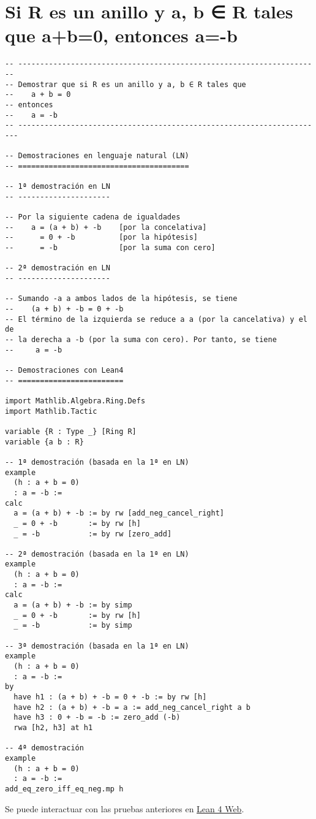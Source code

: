\section{Si R es un anillo y a, b ∈ R tales que a+b=0, entonces a=-b}
\label{sec:org52279c7}
\begin{verbatim}
-- ---------------------------------------------------------------------
-- Demostrar que si R es un anillo y a, b ∈ R tales que
--    a + b = 0
-- entonces
--    a = -b
-- ----------------------------------------------------------------------

-- Demostraciones en lenguaje natural (LN)
-- =======================================

-- 1ª demostración en LN
-- ---------------------

-- Por la siguiente cadena de igualdades
--    a = (a + b) + -b    [por la concelativa]
--      = 0 + -b          [por la hipótesis]
--      = -b              [por la suma con cero]

-- 2ª demostración en LN
-- ---------------------

-- Sumando -a a ambos lados de la hipótesis, se tiene
--    (a + b) + -b = 0 + -b
-- El término de la izquierda se reduce a a (por la cancelativa) y el de
-- la derecha a -b (por la suma con cero). Por tanto, se tiene
--     a = -b

-- Demostraciones con Lean4
-- ========================

import Mathlib.Algebra.Ring.Defs
import Mathlib.Tactic

variable {R : Type _} [Ring R]
variable {a b : R}

-- 1ª demostración (basada en la 1ª en LN)
example
  (h : a + b = 0)
  : a = -b :=
calc
  a = (a + b) + -b := by rw [add_neg_cancel_right]
  _ = 0 + -b       := by rw [h]
  _ = -b           := by rw [zero_add]

-- 2ª demostración (basada en la 1ª en LN)
example
  (h : a + b = 0)
  : a = -b :=
calc
  a = (a + b) + -b := by simp
  _ = 0 + -b       := by rw [h]
  _ = -b           := by simp

-- 3ª demostración (basada en la 1ª en LN)
example
  (h : a + b = 0)
  : a = -b :=
by
  have h1 : (a + b) + -b = 0 + -b := by rw [h]
  have h2 : (a + b) + -b = a := add_neg_cancel_right a b
  have h3 : 0 + -b = -b := zero_add (-b)
  rwa [h2, h3] at h1

-- 4ª demostración
example
  (h : a + b = 0)
  : a = -b :=
add_eq_zero_iff_eq_neg.mp h
\end{verbatim}
Se puede interactuar con las pruebas anteriores en \href{https://lean.math.hhu.de/\#url=https://raw.githubusercontent.com/jaalonso/Calculemus2/main/src/Ig\_opuesto\_si\_suma\_ig\_cero.lean}{Lean 4 Web}.

